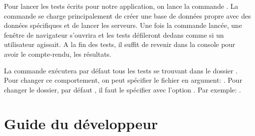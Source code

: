 \documentclass[a4paper,10pt,twoside]{sphinxmanual}
\begin{document}
Pour lancer les tests écrits pour notre application, on lance la commande . La commande se charge principalement de créer une base de données propre avec des données spécifiques et de lancer les serveurs. Une fois la commande lancée, une fenêtre de navigateur s'ouvrira et les tests défileront dedans comme si un utilisateur agissait. A la fin des tests, il suffit de revenir dans la console pour avoir le compte-rendu, les résultats.

La commande exécutera par défaut tous les tests se trouvant dans le dossier . Pour changer ce comportement, on peut spécifier le fichier en argument: . Pour changer le dossier, par défaut , il faut le spécifier avec l'option . Par exemple: .


\chapter{Guide du développeur}
\label{guide::doc}\label{guide:guide-du-developpeur}
\end{document}
